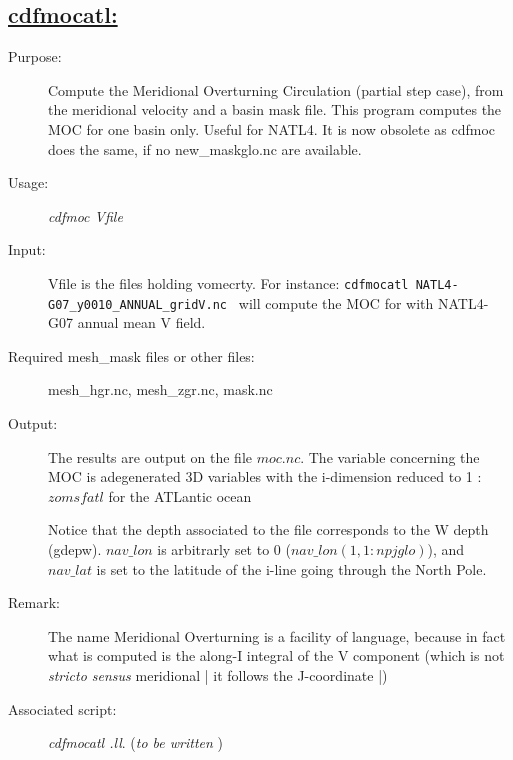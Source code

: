 \documentclass[a4paper,11pt]{article}
\begin{document}
\subsection*{\underline{cdfmocatl:}}
\begin{description}
\item[Purpose:] Compute the Meridional Overturning Circulation (partial step case), from the meridional
velocity and a basin mask file. This program computes the MOC for one basin only. Useful for NATL4.
It is now obsolete as cdfmoc does the same, if no new\_maskglo.nc are available.
\item[Usage:] {\em cdfmoc  Vfile }
\item[Input:] Vfile is the files holding vomecrty.
For instance: {\tt cdfmocatl  NATL4-G07\_y0010\_ANNUAL\_gridV.nc }
will compute the MOC for with NATL4-G07 annual mean V field.
\item[Required mesh\_mask files or other files:]   mesh\_hgr.nc, mesh\_zgr.nc, mask.nc \\
\item[Output:] The results are output on the file $moc.nc$. The variable concerning the MOC is adegenerated 3D variables with the i-dimension
reduced to 1 : $zomsfatl$ for the ATLantic ocean

Notice that the depth associated to the file corresponds to the W depth (gdepw). $nav\_lon$ is arbitrarly set to 0 ($nav\_lon(1,1:npjglo)$),
and $nav\_lat$ is set to the latitude of the i-line going through the North Pole.
\item[Remark:]  The name Meridional Overturning is a facility of language, because in fact what is computed is the along-I integral
of the V component (which is not {\em stricto sensus} meridional | it follows the J-coordinate |)
\item[Associated script:] {\em cdfmocatl .ll}. ({\em to be written} )
\end{description}


\newpage
\end{document}
